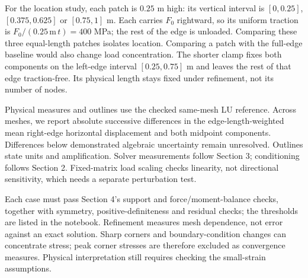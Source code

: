 For the location study, each patch is $0.25$ m high: its vertical interval
is $[0,0.25]$, $[0.375,0.625]$ or $[0.75,1]$ m. Each carries $F_0$
rightward, so its uniform traction is $F_0/(0.25\,\mathrm{m}\,t)=400$ MPa; the rest
of the edge is unloaded. Comparing these three equal-length patches
isolates location. Comparing a patch with the full-edge baseline would
also change load concentration. The shorter clamp fixes both components
on the left-edge interval $[0.25,0.75]$ m and leaves the rest of that
edge traction-free. Its physical length stays fixed under refinement,
not its number of nodes.

Physical measures and outlines use the checked same-mesh LU reference.
Across meshes, we report absolute successive differences in the edge-length-weighted
mean right-edge horizontal displacement and both midpoint components.
Differences below demonstrated algebraic uncertainty remain unresolved.
Outlines state units and amplification. Solver measurements follow Section 3;
conditioning follows Section 2. Fixed-matrix load scaling checks linearity,
not directional sensitivity, which needs a separate perturbation test.

Each case must pass Section 4's support and force/moment-balance checks,
together with symmetry, positive-definiteness and residual checks;
the thresholds are listed in the notebook.
Refinement measures mesh dependence, not error against an exact solution.
Sharp corners and boundary-condition changes can concentrate stress;
peak corner stresses are therefore excluded as convergence measures.
Physical interpretation still requires checking the small-strain assumptions.


